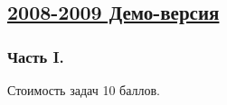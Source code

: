 \newpage
\subsection[2008-2009 Демо-версия]{\hyperref[sec:sol_kr_02_2008_2009_demo]{2008-2009 Демо-версия}}
\label{sec:kr_02_2008_2009_demo}

\subsubsection*{Часть I.}

Стоимость задач 10 баллов.


